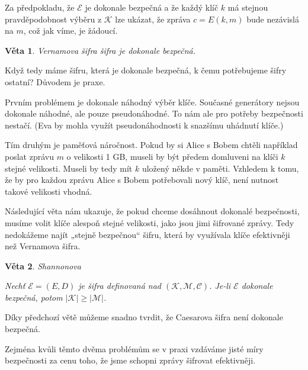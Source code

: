 \documentclass[12pt]{article}
\newtheorem{theorem}{Věta}[section]
\begin{document}
    Za předpokladu, že $\mathcal{E}$ je dokonale bezpečná a že každý klíč $k$ má stejnou pravděpodobnost
    výběru z $\mathcal{K}$ lze ukázat, že zpráva $c = E(k, m)$ bude nezávislá na $m$, což jak víme, je žádoucí.


    \begin{theorem}
        Vernamova šifra šifra je dokonale bezpečná.
    \end{theorem}


    \medskip
    
    Když tedy máme šifru, která je dokonale bezpečná, k čemu potřebujeme šifry ostatní? Důvodem je praxe.

    Prvním problémem je dokonale náhodný výběr klíče. Současné generátory nejsou dokonale náhodné, ale pouze pseudonáhodné.
    To nám ale pro potřeby bezpečnosti nestačí. (Eva by mohla využít pseudonáhodnosti k snazšímu uhádnutí klíče.)

    Tím druhým je paměťová náročnost. Pokud by si Alice s Bobem chtěli například poslat zprávu $m$ o velikosti 1 GB, museli by být předem
    domluveni na klíči $k$ stejné velikosti. Museli by tedy mít $k$ uložený někde v paměti. Vzhledem k tomu, že by
    pro každou zprávu Alice s Bobem potřebovali nový klíč, není nutnost takové velikosti vhodná.

    Následující věta nám ukazuje, že pokud chceme dosáhnout dokonalé bezpečnosti, musíme volit klíče alespoň stejné
    velikosti, jako jsou jimi šifrované zprávy. Tedy nedokážeme najít „stejně bezpečnou“ šifru, která by
    využívala klíče efektivněji než Vernamova šifra.

    \begin{theorem}
        Shannonova

        Nechť $\mathcal{E}  = (E, D)$ je šifra definovaná nad $(\mathcal{K},\mathcal{M},\mathcal{C})$.
        Je-li $\mathcal{E}$ dokonale bezpečná, potom $|\mathcal{K}| \geq |\mathcal{M}|$.
    \end{theorem}


    \medskip

    Díky předchozí větě můžeme snadno tvrdit, že Caesarova šifra není dokonale bezpečná.

    Zejména kvůli těmto dvěma problémům se v praxi vzdáváme jisté míry bezpečnosti za cenu toho, že jsme schopni zprávy šifrovat efektivněji.
\end{document}
